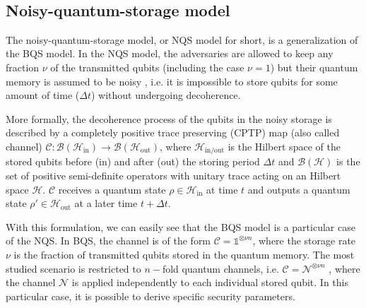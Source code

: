 \

\subsection{Noisy-quantum-storage model}

The noisy-quantum-storage model, or NQS model for short, is a generalization of the BQS model. In the NQS model, the adversaries are allowed to keep any fraction $\nu$ of the transmitted qubits (including the case $\nu=1$) but their quantum memory is assumed to be noisy \cite{KWW12}, i.e. it is impossible to store qubits for some amount of time ($\Delta t$) without undergoing decoherence. 

More formally, the decoherence process of the qubits in the noisy storage is described by a completely positive trace preserving (CPTP) map (also called channel) $\mathcal{C}: \mathcal{B}(\mathcal{H}_{\text{in}})\rightarrow \mathcal{B}(\mathcal{H}_{\text{out}})$, where $\mathcal{H}_{\text{in/out}}$ is the Hilbert space of the stored qubits before (in) and after (out) the storing period $\Delta t$ and $\mathcal{B}(\mathcal{H})$ is the set of positive semi-definite operators with unitary trace acting on an Hilbert space $\mathcal{H}$. $\mathcal{C}$ receives a quantum state $\rho\in \mathcal{H}_{\text{in}}$ at time $t$ and outputs a quantum state $\rho'\in\mathcal{H}_{\text{out}}$ at a later time $t + \Delta t$. %

With this formulation, we can easily see that the BQS model is a particular case of the NQS. In BQS, the channel is of the form $\mathcal{C} = \mathds{1}^{\otimes \nu n}$, where the storage rate $\nu$ is the fraction of transmitted qubits stored in the quantum memory. The most studied scenario is restricted to $n-$fold quantum channels, i.e. $\mathcal{C} = \mathcal{N}^{\otimes \nu n}$ \cite{S10, KWW12, WST08}, where the channel $\mathcal{N}$ is applied independently to each individual stored qubit. In this particular case, it is possible to derive specific security parameters.



